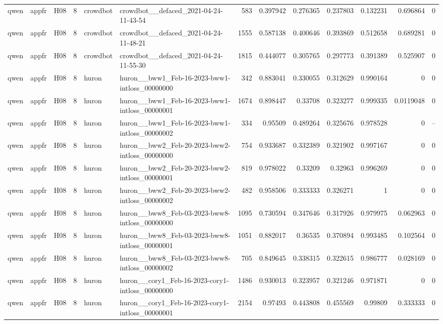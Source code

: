 \begin{longtable}{lllrllrrrrrrr}
qwen & appfr & H08 & 8 & crowdbot & crowdbot\_\_defaced\_2021-04-24-11-43-54 & 583 & 0.397942 & 0.276365 & 0.237803 & 0.132231 & 0.696864 & 0 \\
qwen & appfr & H08 & 8 & crowdbot & crowdbot\_\_defaced\_2021-04-24-11-48-21 & 1555 & 0.587138 & 0.400646 & 0.393869 & 0.512658 & 0.689281 & 0 \\
qwen & appfr & H08 & 8 & crowdbot & crowdbot\_\_defaced\_2021-04-24-11-55-30 & 1815 & 0.444077 & 0.305765 & 0.297773 & 0.391389 & 0.525907 & 0 \\
qwen & appfr & H08 & 8 & huron & huron\_\_bww1\_Feb-16-2023-bww1-intloss\_00000000 & 342 & 0.883041 & 0.330055 & 0.312629 & 0.990164 & 0 & 0 \\
qwen & appfr & H08 & 8 & huron & huron\_\_bww1\_Feb-16-2023-bww1-intloss\_00000001 & 1674 & 0.898447 & 0.33708 & 0.323277 & 0.999335 & 0.0119048 & 0 \\
qwen & appfr & H08 & 8 & huron & huron\_\_bww1\_Feb-16-2023-bww1-intloss\_00000002 & 334 & 0.95509 & 0.489264 & 0.325676 & 0.978528 & 0 & -- \\
qwen & appfr & H08 & 8 & huron & huron\_\_bww2\_Feb-20-2023-bww2-intloss\_00000000 & 754 & 0.933687 & 0.332389 & 0.321902 & 0.997167 & 0 & 0 \\
qwen & appfr & H08 & 8 & huron & huron\_\_bww2\_Feb-20-2023-bww2-intloss\_00000001 & 819 & 0.978022 & 0.33209 & 0.32963 & 0.996269 & 0 & 0 \\
qwen & appfr & H08 & 8 & huron & huron\_\_bww2\_Feb-20-2023-bww2-intloss\_00000002 & 482 & 0.958506 & 0.333333 & 0.326271 & 1 & 0 & 0 \\
qwen & appfr & H08 & 8 & huron & huron\_\_bww8\_Feb-03-2023-bww8-intloss\_00000000 & 1095 & 0.730594 & 0.347646 & 0.317926 & 0.979975 & 0.062963 & 0 \\
qwen & appfr & H08 & 8 & huron & huron\_\_bww8\_Feb-03-2023-bww8-intloss\_00000001 & 1051 & 0.882017 & 0.36535 & 0.370894 & 0.993485 & 0.102564 & 0 \\
qwen & appfr & H08 & 8 & huron & huron\_\_bww8\_Feb-03-2023-bww8-intloss\_00000002 & 705 & 0.849645 & 0.338315 & 0.322615 & 0.986777 & 0.028169 & 0 \\
qwen & appfr & H08 & 8 & huron & huron\_\_cory1\_Feb-16-2023-cory1-intloss\_00000000 & 1486 & 0.930013 & 0.323957 & 0.321246 & 0.971871 & 0 & 0 \\
qwen & appfr & H08 & 8 & huron & huron\_\_cory1\_Feb-16-2023-cory1-intloss\_00000001 & 2154 & 0.97493 & 0.443808 & 0.455569 & 0.99809 & 0.333333 & 0 \\

\end{longtable}
